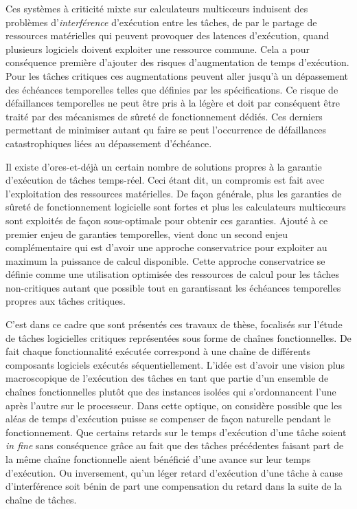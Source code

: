 \documentclass[french, a4paper, 11pt, twoside, pdftex]{StyleThese}
\begin{document}
Ces systèmes à criticité mixte sur calculateurs multicœurs induisent des problèmes d'\textit{interférence} d'exécution entre les tâches, de par le partage de ressources matérielles qui peuvent provoquer des latences d'exécution, quand plusieurs logiciels doivent exploiter une ressource commune. Cela a pour conséquence première d'ajouter des risques d'augmentation de temps d'exécution. Pour les tâches critiques ces augmentations peuvent aller jusqu'à un dépassement des échéances temporelles telles que définies par les spécifications. Ce risque de défaillances temporelles ne peut être pris à la légère et doit par conséquent être traité par des mécanismes de sûreté de fonctionnement dédiés. Ces derniers permettant de minimiser autant qu faire se peut l'occurrence de défaillances catastrophiques liées au dépassement d'échéance.

Il existe d'ores-et-déjà un certain nombre de solutions propres à la garantie d'exécution de tâches temps-réel. Ceci étant dit, un compromis est fait avec l'exploitation des ressources matérielles. De façon générale, plus les garanties de sûreté de fonctionnement logicielle sont fortes et plus les calculateurs multicœurs sont exploités de façon sous-optimale pour obtenir ces garanties. Ajouté à ce premier enjeu de garanties temporelles, vient donc un second enjeu complémentaire qui est d'avoir une approche conservatrice pour exploiter au maximum la puissance de calcul disponible. Cette approche conservatrice se définie comme une utilisation optimisée des ressources de calcul pour les tâches non-critiques autant que possible tout en garantissant les échéances temporelles propres aux tâches critiques.

C'est dans ce cadre que sont présentés ces travaux de thèse, focalisés sur l'étude de tâches logicielles critiques représentées sous forme de chaînes fonctionnelles. De fait chaque fonctionnalité exécutée correspond à une chaîne de différents composants logiciels exécutés séquentiellement. L'idée est d'avoir une vision plus macroscopique de l'exécution des tâches en tant que partie d'un ensemble de chaînes fonctionnelles plutôt que des instances isolées qui s'ordonnancent l'une après l'autre sur le processeur. Dans cette optique, on considère possible que les aléas de temps d'exécution puisse se compenser de façon naturelle pendant le fonctionnement. Que certains retards sur le temps d'exécution d'une tâche soient \textit{in fine} sans conséquence grâce au fait que des tâches précédentes faisant part de la même chaîne fonctionnelle aient bénéficié d'une avance sur leur temps d'exécution. Ou inversement, qu'un léger retard d'exécution d'une tâche à cause d'interférence soit bénin de part une compensation du retard dans la suite de la chaîne de tâches.
\end{document}

